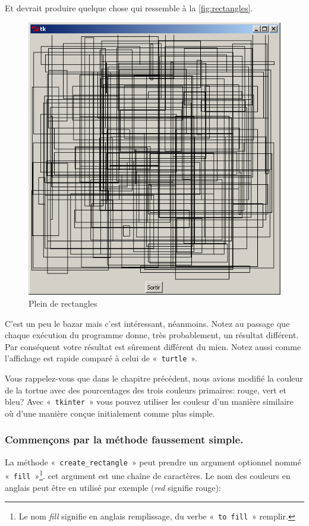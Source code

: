 Et devrait produire quelque chose qui ressemble à la \autoref{fig:rectangles}.
\begin{figure}[h!]
\centering
\includegraphics[scale=0.4]{images/rectangles}
\caption{Plein de rectangles}\label{fig:rectangles}
\end{figure}

C'est un peu le bazar mais c'est intéressant, néanmoins.
Notez au passage que chaque exécution du programme donne, très probablement, un résultat différent. Par conséquent votre résultat est sûrement différent du mien. Notez aussi comme l'affichage est rapide comparé à celui de « \texttt{turtle} ».

Vous rappelez-vous que dans le chapitre précédent, nous avions modifié la couleur de la tortue avec des pourcentages des trois couleurs primaires: rouge, vert et bleu? Avec « \texttt{tkinter} » vous pouvez utiliser les couleur d'un manière similaire où d'une manière conçue initialement comme plus simple.

\subsubsection*{Commençons par la méthode faussement simple.}
La méthode « \texttt{create\_rectangle} » peut prendre un argument optionnel nommé « \texttt{fill} »\footnote{Le nom \emph{fill} signifie en anglais remplissage, du verbe « \texttt{to fill} » remplir.}. cet argument est une chaîne de caractères. Le nom des couleurs en anglais peut être en utilisé par exemple (\emph{red} signifie rouge):

